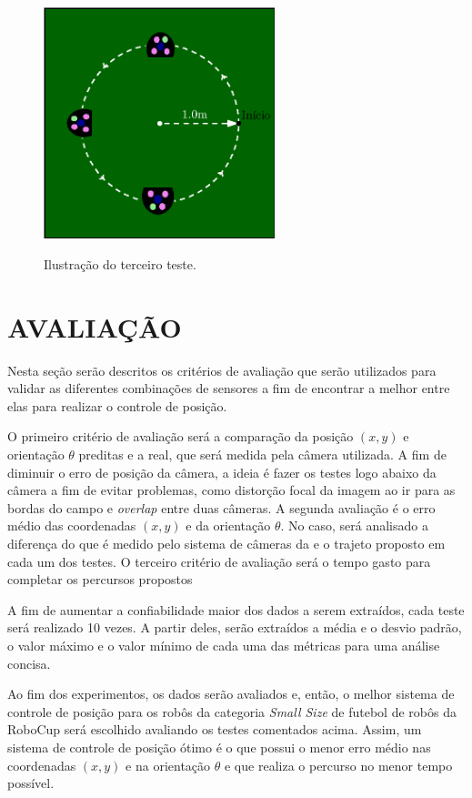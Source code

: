 \documentclass[acronym, symbols, table]{fei}
\begin{document}
		\begin{figure}[!htb]
			\centering
			\caption{Ilustração do terceiro teste.}
			\includegraphics[width=0.6\textwidth]{teste_3.eps}
			\label{fig:metodologia_teste_3}
		\end{figure}
		
	\section{AVALIAÇÃO}
	
		Nesta seção serão descritos os critérios de avaliação que serão utilizados para validar as diferentes combinações de sensores a fim de encontrar a melhor entre elas para realizar o controle de posição.
		
		O primeiro critério de avaliação será a comparação da posição $(x, y)$ e orientação $\theta$ preditas e a real, que será medida pela câmera utilizada. A fim de diminuir o erro de posição da câmera, a ideia é fazer os testes logo abaixo da câmera a fim de evitar problemas, como distorção focal da imagem ao ir para as bordas do campo e \textit{overlap} entre duas câmeras. A segunda avaliação é o erro médio das coordenadas $(x ,y)$ e da orientação $\theta$. No caso, será analisado a diferença do que é medido pelo sistema de câmeras da  e o trajeto proposto em cada um dos testes. O terceiro critério de avaliação será o tempo gasto para completar os percursos propostos
		
		A fim de aumentar a confiabilidade maior dos dados a serem extraídos, cada teste será realizado 10 vezes. A partir deles, serão extraídos a média e o desvio padrão, o valor máximo e o valor mínimo de cada uma das métricas para uma análise concisa.
		
		Ao fim dos experimentos, os dados serão avaliados e, então, o melhor sistema de controle de posição para os robôs da categoria \textit{Small Size} de futebol de robôs da RoboCup será escolhido avaliando os testes comentados acima. Assim, um sistema de controle de posição ótimo é o que possui o menor erro médio nas coordenadas $(x, y)$ e na orientação $\theta$ e que realiza o percurso no menor tempo possível.
		
\end{document}
